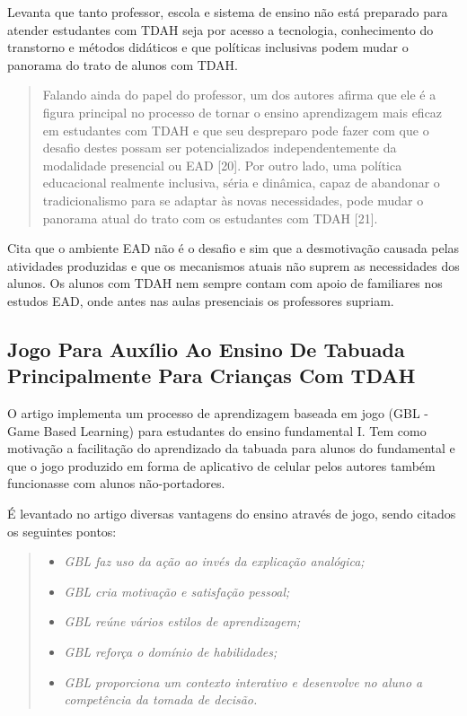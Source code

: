 Levanta que tanto professor, escola e sistema de ensino não está preparado para atender estudantes com TDAH seja por acesso a tecnologia, conhecimento do transtorno e métodos didáticos e que políticas inclusivas podem mudar o panorama do trato de alunos com TDAH. 

\begin{quote}
Falando ainda do papel do professor, um dos autores afirma que ele é a figura principal no processo de tornar o ensino aprendizagem mais eficaz em estudantes com TDAH e que seu despreparo pode fazer com que o desafio destes possam ser potencializados independentemente da modalidade presencial ou EAD [20]. Por outro lado, uma política educacional realmente inclusiva, séria e dinâmica, capaz de abandonar o tradicionalismo para se adaptar às novas necessidades, pode mudar o panorama atual do trato com os estudantes com TDAH [21].
\end{quote}

Cita que o ambiente EAD não é o desafio e sim que a desmotivação causada pelas atividades produzidas e que os mecanismos atuais não suprem as necessidades dos alunos. Os alunos com TDAH nem sempre contam com apoio de familiares nos estudos EAD, onde antes nas aulas presenciais os professores supriam. 


\subsection{Jogo Para Auxílio Ao Ensino De Tabuada Principalmente Para Crianças Com TDAH}

O artigo\cite{sanchez} implementa um processo de aprendizagem baseada em jogo (GBL - Game Based Learning) para estudantes do ensino fundamental I. Tem como motivação a facilitação do aprendizado da tabuada para alunos do fundamental e que o jogo produzido em forma de aplicativo de celular pelos autores também funcionasse com alunos não-portadores.

É levantado no artigo diversas vantagens do ensino através de jogo, sendo citados os seguintes pontos:

\begin{quote}
\begin{itemize}
\item \textit{GBL faz uso da ação ao invés da explicação analógica;}
\item \textit{GBL cria motivação e satisfação pessoal;}
\item \textit{GBL reúne vários estilos de aprendizagem;}
\item \textit{GBL reforça o domínio de habilidades;}
\item \textit{GBL proporciona um contexto interativo e desenvolve no aluno a competência da tomada de decisão.}
\end{itemize}
\end{quote}


